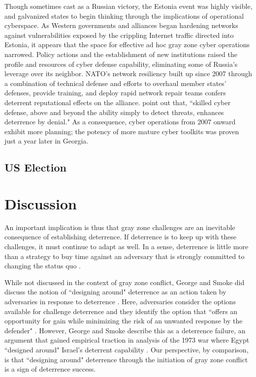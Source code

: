 \documentclass[12pt,letterpaper]{article}
\begin{document}
		Though sometimes cast as a Russian victory, the Estonia event was highly visible, and galvanized states to begin thinking through the implications of operational cyberspace. As Western governments and alliances began hardening networks against vulnerabilities exposed by the crippling Internet traffic directed into Estonia, it appears that the space for effective ad hoc gray zone cyber operations narrowed. Policy actions and the establishment of new institutions raised the profile and resources of cyber defense capability, eliminating some of Russia’s leverage over its neighbor. NATO’s network resiliency built up since 2007 through a combination of technical defense and efforts to overhaul member states' defenses, provide training, and deploy rapid network repair teams confers deterrent reputational effects on the alliance. \citet{lindsay_coercioncyberspacestabilityinstability_2017} point out that, ``skilled cyber defense, above and beyond the ability simply to detect threats, enhances deterrence by denial." As a consequence, cyber operations from 2007 onward exhibit more planning; the potency of more mature cyber toolkits was proven just a year later in Georgia.
	
	\subsection{US Election}

\section{Discussion}
	An important implication is thus that gray zone challenges are an inevitable consequence of establishing deterrence. If deterrence is to keep up with these challenges, it must continue to adapt as well. In a sense, deterrence is little more than a strategy to buy time against an adversary that is strongly committed to changing the status quo \citep{george_deterrenceforeignpolicy_1989}.
		
	While not discussed in the context of gray zone conflict, George and Smoke did discuss the notion of ``designing around" deterrence as an action taken by adversaries in response to deterrence \citep{george_deterrenceamericanforeign_1974}. Here, adversaries consider the options available for challenge deterrence and they identify the option that ``offers an opportunity for gain while minimizing the risk of an unwanted response by the defender" \citep{george_deterrenceforeignpolicy_1989}. However, George and Smoke describe this as a deterrence failure, an argument that gained empirical traction in analysis of the 1973 war where Egypt ``designed around" Israel's deterrent capability \citep{stein_calculationmiscalculationconventional_1989}. Our perspective, by comparison, is that ``designing around" deterrence through the initiation of gray zone conflict is a sign of deterrence success.
		
\end{document}
